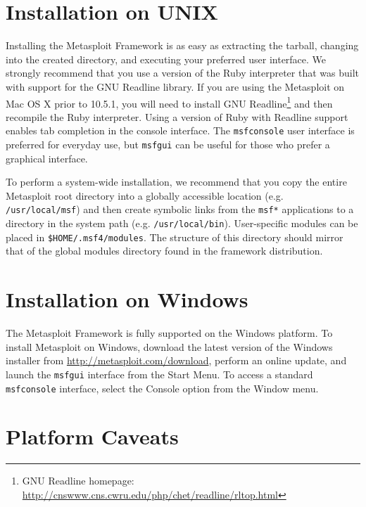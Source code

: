 \documentclass{report}
\begin{document}
    \section{Installation on UNIX}
    \label{INSTALL-UNIX}

\par
Installing the Metasploit Framework is as easy as extracting the tarball,
changing into the created directory, and executing your preferred user
interface. We strongly recommend that you use a version of the Ruby interpreter
that was built with support for the GNU Readline library. If you are using the
Metasploit on Mac OS X prior to 10.5.1, you will need to install GNU
Readline\footnote{GNU Readline homepage:
\url{http://cnswww.cns.cwru.edu/php/chet/readline/rltop.html}} and then
recompile the Ruby interpreter. Using a version of Ruby with Readline support
enables tab completion in the console interface. The \texttt{msfconsole} user
interface is preferred for everyday use, but \texttt{msfgui} can be useful for
those who prefer a graphical interface.

\par
To perform a system-wide installation, we recommend that you copy the entire
Metasploit root directory into a globally accessible location (e.g.
\texttt{/usr/local/msf}) and then create symbolic links from the \texttt{msf*}
applications to a directory in the system path (e.g. \texttt{/usr/local/bin}).
User-specific modules can be placed in \texttt{\$HOME/.msf4/modules}. The
structure of this directory should mirror that of the global modules directory
found in the framework distribution.

    \section{Installation on Windows}
    \label{INSTALL-WIN32}

\par
The Metasploit Framework is fully supported on the Windows platform. To install
Metasploit on Windows, download the latest version of the Windows installer from
\url{http://metasploit.com/download}, perform an online update, and launch the
\texttt{msfgui} interface from the Start Menu. To access a standard
\texttt{msfconsole} interface, select the Console option from the Window menu.

    \section{Platform Caveats}
    \label{INSTALL-CAVEAT}
\end{document}
